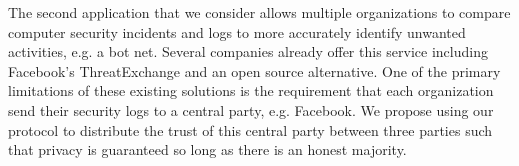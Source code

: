 The second application that we consider allows multiple organizations to compare computer security incidents and logs to more accurately identify unwanted activities, e.g. a bot net. Several companies already offer this service including Facebook's ThreatExchange\cite{threat} and an open source alternative\cite{alt_threat}. One of the primary limitations of these existing solutions is the requirement that each organization send their security logs to a central party, e.g. Facebook. We propose using our protocol to distribute the trust of this central party between three parties such that privacy is guaranteed so long as there is an honest majority.



